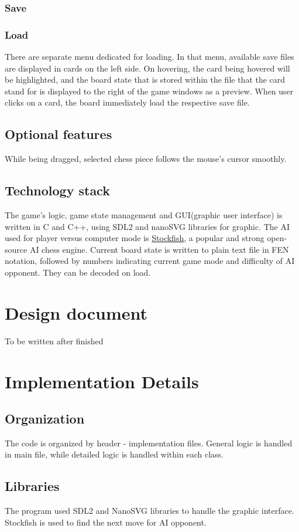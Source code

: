 \documentclass[a4paper, 10pt, titlepage]{report}
\begin{document}
\subsection{Save}

\subsection{Load}
There are separate menu dedicated for loading. In that menu, available save files are displayed in cards on the left side. On hovering, the card being hovered will be highlighted, and the board state that is stored within the file that the card stand for is displayed to the right of the game windows as a preview. When user clicks on a card, the board immediately load the respective save file.
\section{Optional features}
While being dragged, selected chess piece follows the mouse's cursor smoothly.
\section{Technology stack}
The game's logic, game state management and GUI(graphic user interface) is written in C and C++, using SDL2 and nanoSVG libraries for graphic. The AI used for player versus computer mode is \href{https://github.com/official-stockfish/Stockfish}{Stockfish}, a popular and strong open-source AI chess engine. Current board state is written to plain text file in FEN notation, followed by numbers indicating current game mode and difficulty of AI opponent. They can be decoded on load.
\chapter{Design document}
To be written after finished
\chapter{Implementation Details}
\section{Organization}
The code is organized by header - implementation files. General logic is handled in main file, while detailed logic is handled within each class.
\section{Libraries}
The program used SDL2 and NanoSVG libraries to handle the graphic interface. Stockfish is used to find the next move for AI opponent.
\end{document}
